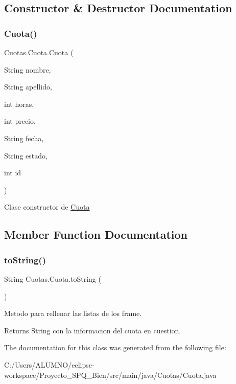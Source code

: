 \subsection{Constructor \& Destructor Documentation}
\mbox{\label{class_cuotas_1_1_cuota_a23fd33a1cefcc811bff2f5b998c29295}} 
\subsubsection{\texorpdfstring{Cuota()}{Cuota()}}
{\footnotesize\ttfamily Cuotas.\+Cuota.\+Cuota (\begin{DoxyParamCaption}\item[{String}]{nombre,  }\item[{String}]{apellido,  }\item[{int}]{horas,  }\item[{int}]{precio,  }\item[{String}]{fecha,  }\item[{String}]{estado,  }\item[{int}]{id }\end{DoxyParamCaption})}

Clase constructor de \hyperlink{class_cuotas_1_1_cuota}{Cuota} 

\subsection{Member Function Documentation}
\mbox{\label{class_cuotas_1_1_cuota_aab4caea7cc4183a96763c7a2c5b298f2}} 
\subsubsection{\texorpdfstring{to\+String()}{toString()}}
{\footnotesize\ttfamily String Cuotas.\+Cuota.\+to\+String (\begin{DoxyParamCaption}{ }\end{DoxyParamCaption})}

Metodo para rellenar las listas de los frame. \begin{DoxyReturn}{Returns}
String con la informacion del cuota en cuestion. 
\end{DoxyReturn}


The documentation for this class was generated from the following file\+:\begin{DoxyCompactItemize}
\item 
C\+:/\+Users/\+A\+L\+U\+M\+N\+O/eclipse-\/workspace/\+Proyecto\+\_\+\+S\+P\+Q\+\_\+Bien/src/main/java/\+Cuotas/Cuota.\+java\end{DoxyCompactItemize}
